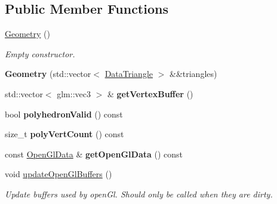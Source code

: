 \subsection*{Public Member Functions}
\begin{DoxyCompactItemize}
\item 
\mbox{\label{classpepr3d_1_1_geometry_ad9cad69d72176d09ebb2f345ca862b01}} 
\mbox{\hyperlink{classpepr3d_1_1_geometry_ad9cad69d72176d09ebb2f345ca862b01}{Geometry}} ()
\begin{DoxyCompactList}\small\item\em Empty constructor. \end{DoxyCompactList}\item 
\mbox{\label{classpepr3d_1_1_geometry_ab35ff0294173d65bba8fc6f101046ede}} 
{\bfseries Geometry} (std\+::vector$<$ \mbox{\hyperlink{classpepr3d_1_1_data_triangle}{Data\+Triangle}} $>$ \&\&triangles)
\item 
\mbox{\label{classpepr3d_1_1_geometry_abb5ab45b0a5f5d84b38fae0d1bbc71ab}} 
std\+::vector$<$ glm\+::vec3 $>$ \& {\bfseries get\+Vertex\+Buffer} ()
\item 
\mbox{\label{classpepr3d_1_1_geometry_acd5c4c218183865d75c38534918f3cdd}} 
bool {\bfseries polyhedron\+Valid} () const
\item 
\mbox{\label{classpepr3d_1_1_geometry_a09ca8294ff86ad47e8cbd2051e0b02df}} 
size\+\_\+t {\bfseries poly\+Vert\+Count} () const
\item 
\mbox{\label{classpepr3d_1_1_geometry_a2c1c327d2f449865a3c66fae52b0b54a}} 
const \mbox{\hyperlink{structpepr3d_1_1_geometry_1_1_open_gl_data}{Open\+Gl\+Data}} \& {\bfseries get\+Open\+Gl\+Data} () const
\item 
\mbox{\label{classpepr3d_1_1_geometry_a1550192711eb10ddb685c08d15ef9922}} 
void \mbox{\hyperlink{classpepr3d_1_1_geometry_a1550192711eb10ddb685c08d15ef9922}{update\+Open\+Gl\+Buffers}} ()
\begin{DoxyCompactList}\small\item\em Update buffers used by open\+Gl. Should only be called when they are dirty. \end{DoxyCompactList}\item 

\end{DoxyCompactItemize}
